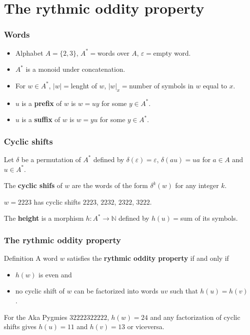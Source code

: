 \documentclass{beamer}
\theoremstyle{definition}
\begin{document}



\section{The rythmic oddity property}

\begin{frame}
\frametitle{Words}
\begin{itemize}
\item<1-> Alphabet $A=\{2,3\}$, $A^*=$words over $A$, $\varepsilon=$empty word. 
\item<2-> $A^*$ is a monoid under concatenation.
\item<3-> For $w\in A^*$, $|w|=$lenght of $w$, $|w|_x=$number of symbols in $w$ equal to $x$.
\item<4-> $u$ is a \textbf{prefix} of $w$ is $w=uy$ for some $y\in A^*$.
\item<5-> $u$ is a \textbf{suffix} of $w$ is $w=yu$ for some $y\in A^*$.
\end{itemize}
\end{frame}

\begin{frame}
\frametitle{Cyclic shifts}
Let $\delta$ be a permutation of $A^*$ defined by $\delta(\varepsilon)=\varepsilon$, $\delta(au)=ua$ for $a\in A$ and $u\in A^*$.

The \textbf{cyclic shifs} of $w$ are the words of the form $\delta^k(w)$ for any integer $k$. 

\begin{example}
$w=2223$ has cyclic shifts $2223$, $2232$, $2322$, $3222$.  
\end{example}
The \textbf{height} is a morphism $h:A^*\to\mathbb{N}$ defined by $h(u)=$sum of its symbols. 
\end{frame}

\begin{frame}
\frametitle{The rythmic oddity property}
\begin{alertblock}{Definition}
A word $w$ satisfies the \textbf{rythmic oddity property} if and only if
\begin{itemize}
\item $h(w)$ is even and
\item no cyclic shift of $w$ can be factorized into words $uv$ such that $h(u)=h(v)$. 
\end{itemize}
\end{alertblock}
\begin{example}
For the Aka Pygmies $32222322222$, $h(w)=24$ and any factorization of cyclic shifts gives $h(u)=11$ and $h(v)=13$ or viceversa. 
\end{example}
\end{frame}
\end{document}
